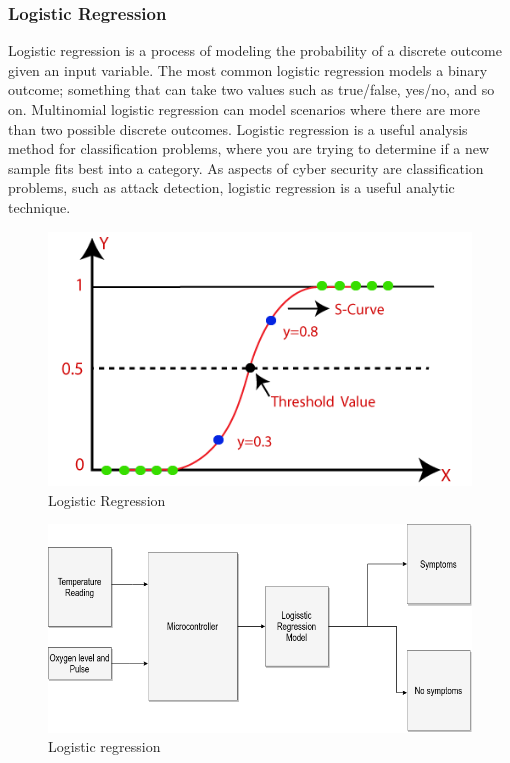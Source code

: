 \documentclass[a4paper,12pt]{report}
\begin{document}
\subsubsection{Logistic Regression}
Logistic regression is a process of modeling the probability of a discrete outcome given an
input variable. The most common logistic regression models a binary outcome; something
that can take two values such as true/false, yes/no, and so on. Multinomial logistic regression can model scenarios where there are more than two possible discrete outcomes. Logistic
regression is a useful analysis method for classification problems, where you are trying to
determine if a new sample fits best into a category. As aspects of cyber security are classification problems, such as attack detection, logistic regression is a useful analytic technique.
\begin{figure}[h] %
   \begin{center}
   \includegraphics[scale=0.6]{regression.png}
   \caption{Logistic Regression}
  \end{center}
  \end{figure}

  \begin{figure}[h] %
   \begin{center}
   \includegraphics[scale=0.6]{logistic.png}
   \caption{Logistic regression}
  \end{center}
  \end{figure}
  
\end{document}
